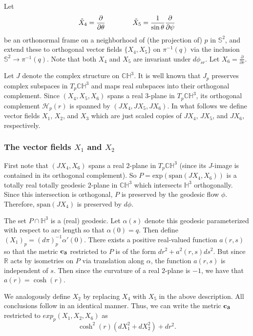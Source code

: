 \documentclass[10pt]{amsart}
\def\R{\mathbb{R}}
\def\S{\mathcal{S}}
\def\a{\alpha}
\def\ddt{\frac{\partial}{\partial \theta}}
\def\ddr{\frac{\partial}{\partial r}}
\def\th{\theta}
\def\H{\mathbb{H}}
\def\C{\mathbb{C}}
\def\S{\mathbb{S}}
\def\dds{\frac{\partial}{\partial \psi}}
\theoremstyle{definition}
\theoremstyle{remark}
\numberwithin{equation}{section}
\begin{document}
Let 
	\begin{equation}\label{eqn:X4 and X5 check}
	\check{X}_4 = \ddt	\hskip 40pt	\check{X}_5 = \frac{1}{\sin \th} \dds
	\end{equation}
be an orthonormal frame on a neighborhood of (the projection of) $p$ in $\S^2$, and extend these to orthogonal vector fields $\{ X_4, X_5 \}$ on $\pi^{-1}(q)$ via the inclusion $\S^2 \to \pi^{-1}(q)$.  
 Note that both $X_4$ and $X_5$ are invariant under $d \phi_{sr}$.  
 Let $X_6 = \ddr$.

Let $J$ denote the complex structure on $\C \H^3$.  
It is well known that $J_p$ preserves complex subspaces in $T_p \C \H^3$ and maps real subspaces into their orthogonal complement.
Since $\left( X_4, X_5, X_6 \right)$ spans a real $3$-plane in $T_p \C \H^3$, its orthogonal complement $\mathcal{H}_p(r)$ is spanned by $\left( JX_4, JX_5, JX_6 \right)$.  
In what follows we define vector fields $X_1$, $X_2$, and $X_3$ which are just scaled copies of $JX_4$, $JX_5$, and $JX_6$, respectively.


\subsubsection{The vector fields $X_1$ and $X_2$}
First note that $\left( JX_4, X_6 \right)$ spans a real $2$-plane in $T_p \C \H^3$ (since its $J$-image is contained in its orthogonal complement).  
So $P = \text{exp} \left( \text{span} \left( JX_4, X_6 \right) \right)$ is a totally real totally geodesic $2$-plane in $\C \H^3$ which intersects $\H^3$ orthogonally.
Since this intersection is orthogonal, $P$ is preserved by the geodesic flow $\phi$.  
Therefore, $\text{span} \left( JX_4 \right)$ is preserved by $d \phi$.  

The set $P \cap \H^3$ is a (real) geodesic.  
Let $\a(s)$ denote this geodesic parameterized with respect to arc length so that $\a(0) = q$.  
Then define $(X_1)_p = (d \pi)^{-1}_p \a'(0)$.  
There exists a positive real-valued function $a(r,s)$ so that the metric ${\bf c_3}$ restricted to $P$ is of the form $dr^2 + a^2(r,s) ds^2$.  
But since $\R$ acts by isometries on $P$ via translation along $\a$, the function $a(r,s)$ is independent of $s$.
Then since the curvature of a real $2$-plane is $-1$, we have that $a(r) = \cosh(r)$.  

We analogously define $X_2$ by replacing $X_4$ with $X_5$ in the above description.  
All conclusions follow in an identical manner.  
Thus, we can write the metric ${\bf c_3}$ restricted to $exp_p(X_1,X_2,X_6)$ as
	\begin{equation*}
	\cosh^2(r) (dX_1^2 + dX_2^2 ) + dr^2.
	\end{equation*}
\end{document}
